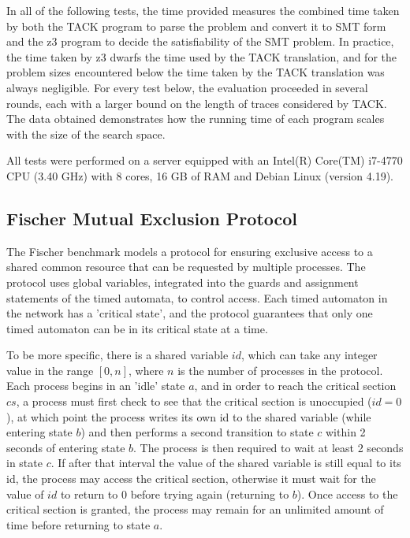 \documentclass[a4paper,12pt]{article}
\begin{document}
In all of the following tests, the time provided measures the combined time
taken by both the TACK program to parse the problem and convert it to SMT form and
the z3 program to decide the satisfiability of the SMT problem. In practice,
the time taken by z3 dwarfs the time used by the TACK translation, and for the
problem sizes encountered below the time taken by the TACK translation was always
negligible. For every test below, the evaluation proceeded in several rounds,
each with a larger bound on the length of traces considered by TACK. The data
obtained demonstrates how the running time of each program scales with the size
of the search space.

All tests were performed on a server equipped with an Intel(R) Core(TM) i7-4770
CPU (3.40 GHz) with 8 cores, 16 GB of RAM and Debian Linux (version 4.19).



\subsection{Fischer Mutual Exclusion Protocol}\label{evaluation-fischer}
The Fischer benchmark models a protocol for ensuring exclusive access to a
shared common resource that can be requested by multiple processes. The protocol
uses global variables, integrated into the guards and assignment statements of
the timed automata, to control access. Each timed automaton in the network has a
'critical state', and the protocol guarantees that only one timed automaton can
be in its critical state at a time.

To be more specific, there is a shared variable \(id\), which can take any
integer value in the range \([0,n]\), where \(n\) is the number of processes in the
protocol. Each process begins in an 'idle' state \(a\), and in order to reach the
critical section \(cs\), a process must first check to see that the critical
section is unoccupied (\(id=0\)), at which point the process writes its own id to
the shared variable (while entering state \(b\)) and then performs a second
transition to state \(c\) within 2 seconds of entering state \(b\). The process is
then required to wait at least 2 seconds in state \(c\). If after that interval
the value of the shared variable is still equal to its id, the process may access
the critical section, otherwise it must wait for the value of \(id\) to return
to \(0\) before trying again (returning to \(b\)). Once access to the critical
section is granted, the process may remain for an unlimited amount of time before
returning to state \(a\).
\end{document}
